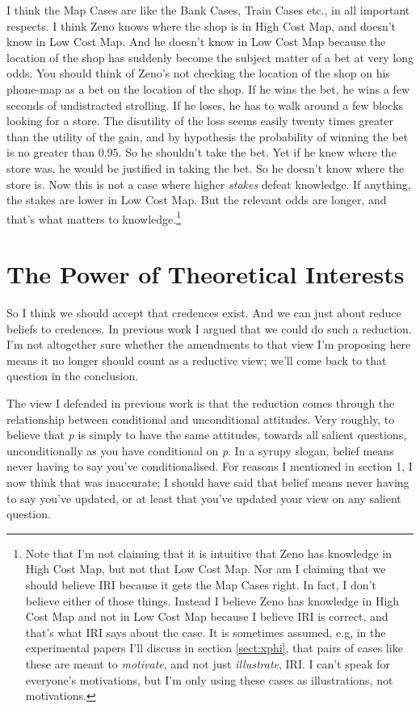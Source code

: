 \noindent I think the Map Cases are like the Bank Cases, Train Cases etc., in all important respects. I think Zeno knows where the shop is in High Cost Map, and doesn't know in Low Cost Map. And he doesn't know in Low Cost Map because the location of the shop has suddenly become the subject matter of a bet at very long odds. You should think of Zeno's not checking the location of the shop on his phone-map as a bet on the location of the shop. If he wins the bet, he wins a few seconds of undistracted strolling. If he loses, he has to walk around a few blocks looking for a store. The disutility of the loss seems easily twenty times greater than the utility of the gain, and by hypothesis the probability of winning the bet is no greater than 0.95. So he shouldn't take the bet. Yet  if he knew where the store was, he would be justified in taking the bet. So he doesn't know where the store is. Now this is not a case where higher \textit{stakes} defeat knowledge. If anything, the stakes are lower in Low Cost Map. But the relevant odds are longer, and that's what matters to knowledge.\footnote{Note that I'm not claiming that it is intuitive that Zeno has knowledge in High Cost Map, but not that Low Cost Map. Nor am I claiming that we should believe IRI because it gets the Map Cases right. In fact, I don't believe either of those things. Instead I believe Zeno has knowledge in High Cost Map and not in Low Cost Map because I believe IRI is correct, and that's what IRI says about the case. It is sometimes assumed, e.g, in the experimental papers I'll discuss in section \ref{sect:xphi}, that pairs of cases like these are meant to \textit{motivate}, and not just \textit{illustrate}, IRI. I can't speak for everyone's motivations, but I'm only using these cases as illustrations, not motivations.}


\section{The Power of Theoretical Interests}
So I think we should accept that credences exist. And we can just about reduce beliefs to credences. In previous work I argued that we could do such a reduction. I'm not altogether sure whether the amendments to that view I'm proposing here means it no longer should count as a reductive view; we'll come back to that question in the conclusion.

The view I defended in previous work is that the reduction comes through the relationship between conditional and unconditional attitudes. Very roughly, to believe that \emph{p} is simply to have the same attitudes, towards all salient questions, unconditionally as you have conditional on \emph{p}. In a syrupy slogan, belief means never having to say you've conditionalised. For reasons I mentioned in section 1, I now think that was inaccurate; I should have said that belief means never having to say you've updated, or at least that you've updated your view on any salient question.

